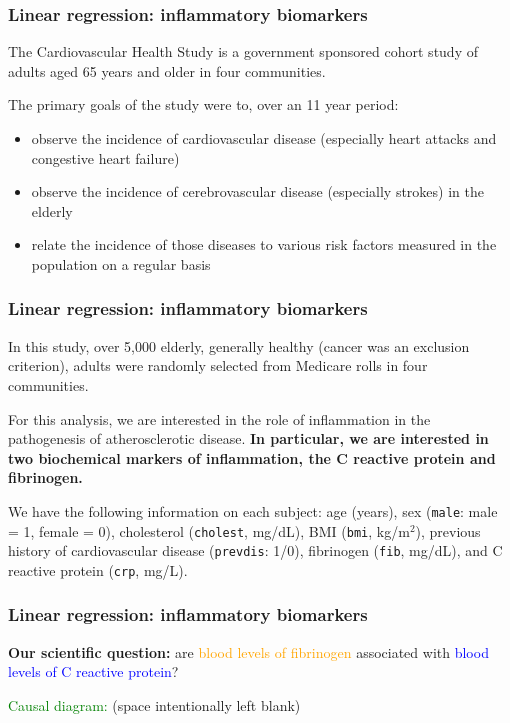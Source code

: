 \documentclass[12pt, 
hyperref={colorlinks=true, linkcolor=blue, urlcolor=cyan},dvipsnames]{beamer}
\begin{document}
\begin{frame}
\frametitle{Linear regression: inflammatory biomarkers}
The Cardiovascular Health Study is a government sponsored cohort study of adults aged 65 years and older in four communities.

The primary goals of the study were to, over an 11 year period:\vspace{-0.3cm}
\begin{itemize}
\item observe the incidence of cardiovascular disease (especially heart attacks and congestive heart failure)
\item observe the incidence of cerebrovascular disease (especially strokes) in the elderly 
\item relate the incidence of those diseases to various risk factors measured in the population on a regular basis
\end{itemize}
\end{frame}

\begin{frame}
\frametitle{Linear regression: inflammatory biomarkers}
In this study, over 5,000 elderly, generally healthy (cancer was an exclusion criterion), adults were randomly selected from Medicare rolls in four communities.

For this analysis, we are interested in the role of inflammation in the pathogenesis of atherosclerotic disease. \textbf{In particular, we are interested in two biochemical markers of inflammation, the C reactive protein and fibrinogen.}

We have the following information on each subject: age (years), sex (\texttt{male}: male = 1, female = 0), cholesterol (\texttt{cholest}, mg/dL), BMI (\texttt{bmi}, kg/m${}^2$), previous history of cardiovascular disease (\texttt{prevdis}: 1/0), fibrinogen (\texttt{fib}, mg/dL), and C reactive protein (\texttt{crp}, mg/L).
\end{frame}

\begin{frame}
\frametitle{Linear regression: inflammatory biomarkers}
\textbf{Our scientific question:} are \textcolor{orange}{blood levels of fibrinogen} associated with \textcolor{blue}{blood levels of C reactive protein}? \pause

\textcolor{green}{Causal diagram: } {\small (space intentionally left blank)} \vspace{5cm}

\end{frame}
\end{document}
